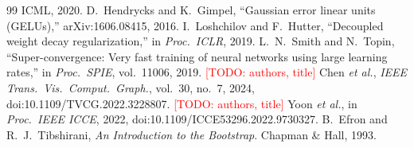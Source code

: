 \documentclass[conference]{IEEEtran}
\newcommand{\todo}[1]{\textcolor{red}{[TODO: #1]}}
\begin{document}
\begin{thebibliography}{99}
{ICML}, 2020.
 D.~Hendrycks and K.~Gimpel, ``Gaussian error linear units (GELUs),'' arXiv:1606.08415, 2016.
 I.~Loshchilov and F.~Hutter, ``Decoupled weight decay regularization,'' in \emph{Proc.\ ICLR},
2019.
 L.~N.~Smith and N.~Topin, ``Super-convergence: Very fast training of neural networks using large learning
rates,'' in \emph{Proc.\ SPIE}, vol.~11006, 2019.
 \todo{authors, title} Chen \emph{et al.}, \emph{IEEE Trans.\ Vis.\ Comput.\ Graph.}, vol.~30,
no.~7, 2024, doi:10.1109/TVCG.2022.3228807.
 \todo{authors, title} Yoon \emph{et al.}, in \emph{Proc.\ IEEE ICCE}, 2022,
doi:10.1109/ICCE53296.2022.9730327.
 B.~Efron and R.~J.~Tibshirani, \emph{An Introduction to the Bootstrap}. Chapman \& Hall, 1993.
\end{thebibliography}
\end{document}
